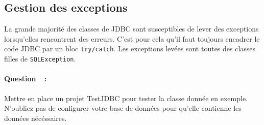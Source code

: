 \documentclass[a4paper,11pt]{article}
\newcounter{compteurQuestion}
\newcommand{\Question}{\paragraph*{Question~\thecompteurQuestion~:}\addtocounter{compteurQuestion}{1}}
\begin{document}
\subsection{Gestion des exceptions}
La grande majorité des classes de JDBC sont susceptibles de lever des exceptions lorsqu'elles 
rencontrent des erreurs. C'est pour cela qu'il faut toujours encadrer le code JDBC par un 
bloc \texttt{try/catch}. Les exceptions levées sont toutes des classes filles de \texttt{SQLException}.

\Question Mettre en place un projet TestJDBC pour tester la classe donnée en exemple. 
N'oubliez pas de configurer votre base de données pour qu'elle contienne les données nécéssaires.
\end{document}
